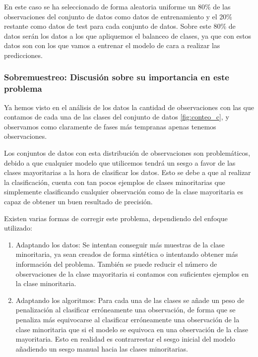En este caso se ha seleccionado de forma aleatoria uniforme un 80\% de las observaciones del conjunto de datos como datos de entrenamiento y el 20\% restante como datos de test para cada conjunto de datos. Sobre este 80\% de datos serán los datos a los que apliquemos el balanceo de clases, ya que con estos datos son con los que vamos a entrenar el modelo de cara a realizar las predicciones.

\newpage

\subsubsection{Sobremuestreo: Discusión sobre su importancia en este problema}

Ya hemos visto en el análisis de los datos la cantidad de observaciones con las que contamos de cada una de las clases del conjunto de datos \ref{fig:conteo_c}, y observamos como claramente de fases más tempranas apenas tenemos observaciones.

Los conjuntos de datos con esta distribución de observaciones son problemáticos, debido a que cualquier modelo que utilicemos tendrá un sesgo a favor de las clases mayoritarias a la hora de clasificar los datos. Esto se debe a que al realizar la clasificación, cuenta con tan pocos ejemplos de clases minoritarias que simplemente clasificando cualquier observación como de la clase mayoritaria es capaz de obtener un buen resultado de precisión.

Existen varias formas de corregir este problema, dependiendo del enfoque utilizado:

\begin{enumerate}
	\item Adaptando los datos: Se intentan conseguir más muestras de la clase minoritaria, ya sean creados de forma sintética o intentando obtener más información del problema. También se puede reducir el número de observaciones de la clase mayoritaria si contamos con suficientes ejemplos en la clase minoritaria.
	\item Adaptando los algoritmos: Para cada una de las clases se añade un peso de penalización al clasificar erróneamente una observación, de forma que se penaliza más equivocarse al clasificar erróneamente una observación de la clase minoritaria que si el modelo se equivoca en una observación de la clase mayoritaria. Esto en realidad es contrarrestar el sesgo inicial del modelo añadiendo un sesgo manual hacia las clases minoritarias.
\end{enumerate}

